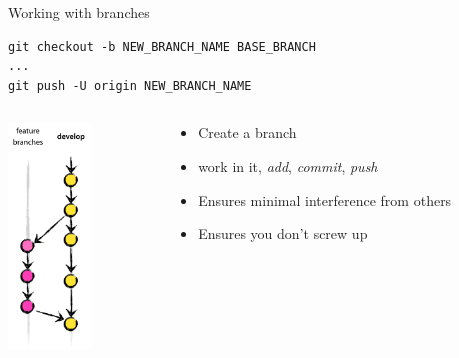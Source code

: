 \documentclass[table,svgnames,aspectratio=169]{beamer}
\begin{document}
\begin{frame}[fragile,label={sec:orgb3117a5}]{Working with branches}
 \lstset{language=bash,label= ,caption= ,captionpos=b,numbers=none}
\begin{lstlisting}
git checkout -b NEW_BRANCH_NAME BASE_BRANCH
...
git push -U origin NEW_BRANCH_NAME
\end{lstlisting}

\begin{columns}
\begin{column}{.5\columnwidth}
\begin{center}
\includegraphics[height=6cm]{graphics/fb2x.png}
\end{center}
\end{column}

\begin{column}{.5\columnwidth}
\begin{itemize}
\item Create a branch
\item work in it, \emph{add}, \emph{commit}, \emph{push}
\item Ensures minimal interference from others
\item Ensures you don't screw up
\end{itemize}
\end{column}
\end{columns}
\end{frame}
\end{document}
